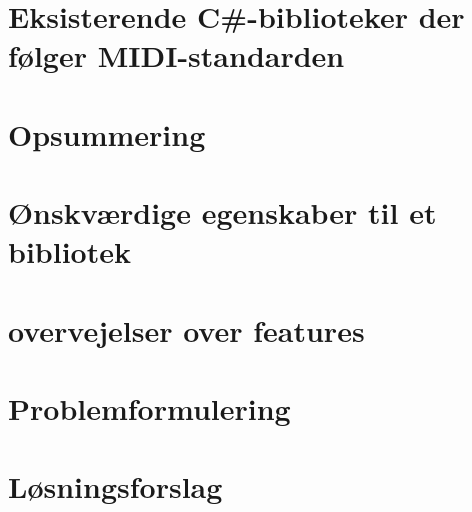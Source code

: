 \section{Eksisterende C\#-biblioteker der følger MIDI-standarden} 

\section{Opsummering}

\section{Ønskværdige egenskaber til et bibliotek}
\section{overvejelser over features}
\section{Problemformulering}
\section{Løsningsforslag}

\printbibliography[heading=bibintoc]
\label{bib:mybiblio}
\appendix


